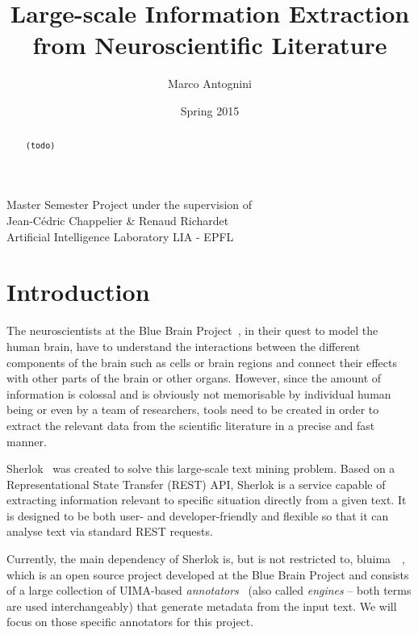 \documentclass{article}
\title{Large-scale Information Extraction from Neuroscientific Literature}
\date{Spring 2015}
\author{Marco Antognini}
\newcommand{\TODO}[1]{\texttt{\textcolor{YellowOrange}{(#1)}}} %
\begin{document}
\maketitle

\begin{center}
    Master Semester Project under the supervision of\\
    Jean-Cédric Chappelier \& Renaud Richardet\\
    Artificial Intelligence Laboratory LIA - EPFL
\end{center}

\begin{abstract}
  \TODO{todo}
\end{abstract}

\newpage
{}


\tableofcontents

\section{Introduction}

The neuroscientists at the Blue Brain Project~\cite{bbp}, in their quest to model the human brain,
have to understand the interactions between the different components of the brain such as cells or
brain regions and connect their effects with other parts of the brain or other organs.  However,
since the amount of information is colossal and is obviously not memorisable by individual human
being or even by a team of researchers, tools need to be created in order to extract the relevant
data from the scientific literature in a precise and fast manner.

Sherlok~\cite{sherlok} was created to solve this large-scale text mining problem. Based on a
Representational State Transfer (REST) API, Sherlok is a service capable of extracting information
relevant to specific situation directly from a given text. It is designed to be both user- and
developer-friendly and flexible so that it can analyse text via standard REST requests.

Currently, the main dependency of Sherlok is, but is not restricted to,
bluima~\cite{bluima}~\cite{bluima_2013}, which is an open source project developed at the Blue Brain
Project and consists of a large collection of UIMA-based \emph{annotators}~\cite{uima} (also called
\emph{engines} -- both terms are used interchangeably) that generate metadata from the input text.
We will focus on those specific annotators for this project.
\end{document}
